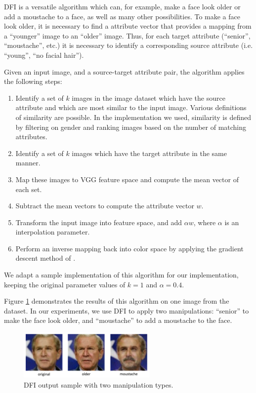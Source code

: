 \documentclass[pageno]{cos429}
\begin{document}
DFI is a versatile algorithm which can, for example, make a face look older or add a moustache to a face, as well as many other possibilities. To make a face look older, it is necessary to find a attribute vector that provides a mapping from a ``younger'' image to an ``older'' image. Thus, for each target attribute (``senior'', ``moustache'', etc.) it is necessary to identify a corresponding source attribute (i.e. ``young'', ``no facial hair'').

Given an input image, and a source-target attribute pair, the algorithm applies the following steps:

\begin{enumerate}
    \item Identify a set of $k$ images in the image dataset which have the source attribute and which are most similar to the input image. Various definitions of similarity are possible. In the implementation we used, similarity is defined by filtering on gender and ranking images based on the number of matching attributes.
    \item Identify a set of $k$ images which have the target attribute in the same manner.
    \item Map these images to VGG feature space and compute the mean vector of each set.
    \item Subtract the mean vectors to compute the attribute vector $w$.
    \item Transform the input image into feature space, and add $\alpha w$, where $\alpha$ is an interpolation parameter.
    \item Perform an inverse mapping back into color space by applying the gradient descent method of \cite{DBLP:journals/corr/MahendranV14}.
\end{enumerate}

We adapt a sample implementation of this algorithm for our implementation, keeping the original parameter values of $k = 1$ and $\alpha = 0.4$.

Figure \ref{fig:dfi} demonstrates the results of this algorithm on one image from the dataset. In our experiments, we use DFI to apply two manipulations: ``senior'' to make the face look older, and ``moustache'' to add a moustache to the face.

\begin{figure}
    \centering
    \includegraphics[width=0.6\textwidth]{../figures/dfi.png}
    \caption{DFI output sample with two manipulation types.}
    \label{fig:dfi}
\end{figure}
\end{document}
